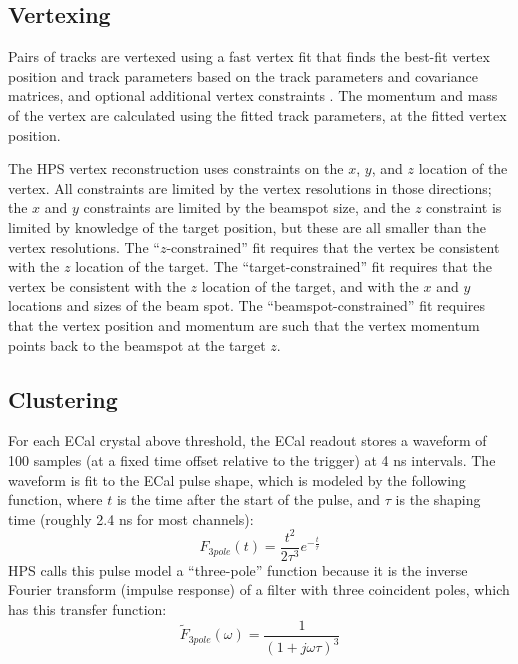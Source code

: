 \subsection{Vertexing}
\label{sec:vertex_recon}
Pairs of tracks are vertexed using a fast vertex fit that finds the best-fit vertex position and track parameters based on the track parameters and covariance matrices, and optional additional vertex constraints \cite{billoir_fast_1992}.
The momentum and mass of the vertex are calculated using the fitted track parameters, at the fitted vertex position.

The HPS vertex reconstruction uses constraints on the $x$, $y$, and $z$ location of the vertex.
All constraints are limited by the vertex resolutions in those directions; the $x$ and $y$ constraints are limited by the beamspot size, and the $z$ constraint is limited by knowledge of the target position, but these are all smaller than the vertex resolutions.
The ``$z$-constrained'' fit requires that the vertex be consistent with the $z$ location of the target.
The ``target-constrained'' fit requires that the vertex be consistent with the $z$ location of the target, and with the $x$ and $y$ locations and sizes of the beam spot.
The ``beamspot-constrained'' fit requires that the vertex position and momentum are such that the vertex momentum points back to the beamspot at the target $z$.

\subsection{Clustering}
\label{sec:clustering}
For each ECal crystal above threshold, the ECal readout stores a waveform of 100 samples (at a fixed time offset relative to the trigger) at 4 ns intervals.
The waveform is fit to the ECal pulse shape, which is modeled by the following function, where $t$ is the time after the start of the pulse, and $\tau$ is the shaping time (roughly 2.4 ns for most channels):
\begin{equation}
    F_{3pole}(t) = \frac{t^2}{2\tau^3} e^{-\frac{t}{\tau}}
\end{equation}
HPS calls this pulse model a ``three-pole'' function because it is the inverse Fourier transform (impulse response) of a filter with three coincident poles, which has this transfer function:
\begin{equation}
    \tilde{F}_{3pole}(\omega) = \frac{1}{(1+j\omega\tau)^3}
\end{equation}

